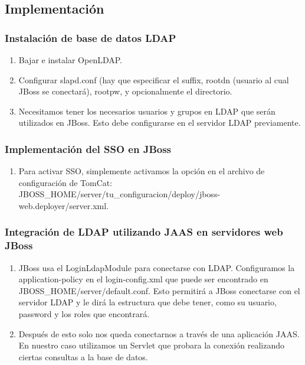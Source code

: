 \subsection{Implementación}

	\subsubsection{Instalación de base de datos LDAP}
	\begin{enumerate}
		\item Bajar e instalar OpenLDAP.
		\item Configurar slapd.conf (hay que especificar el suffix, rootdn (usuario al
cual JBoss se conectará), rootpw, y opcionalmente el directorio.
		\item  Necesitamos tener los necesarios usuarios y grupos en LDAP que serán
utilizados en JBoss. Esto debe configurarse en el servidor LDAP previamente.
	\end{enumerate}

	\subsubsection{Implementación del SSO en JBoss}
	\begin{enumerate}
		\item Para activar SSO, simplemente activamos la opción en el archivo
de configuración de TomCat: JBOSS\_HOME/server/tu\_configuracion/deploy/jboss-web.deployer/server.xml.

	\end{enumerate}
	\subsubsection{Integración de LDAP utilizando JAAS en servidores web JBoss}
	\begin{enumerate}
			\item JBoss usa el LoginLdapModule para conectarse con LDAP.
			Configuramos la application-policy en el login-config.xml que puede ser encontrado en JBOSS\_HOME/server/default.conf. Esto permitirá a JBoss conectarse con el servidor LDAP y le dirá la estructura que debe tener, como su usuario, password y los roles que encontrará.
			\item Después de esto solo nos queda conectarnos a través de una
aplicación JAAS. En nuestro caso utilizamos un Servlet que probara la
conexión realizando ciertas consultas a la base de datos.
	\end{enumerate}
%
